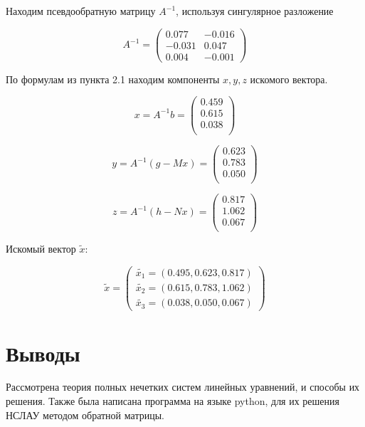 \documentclass[12pt]{article}
\begin{document}
Находим псевдообратную матрицу $A^{-1}$, используя сингулярное разложение

\[
	A^{-1} = \begin{pmatrix}
		0.077  & -0.016 \\
		-0.031 & 0.047  \\
		0.004  & -0.001
	\end{pmatrix}
\]

По формулам из пункта 2.1 находим компоненты $x, y, z$ искомого вектора.

\[
	x = A^{-1} b = \begin{pmatrix}
		0.459 \\
		0.615 \\
		0.038 \\
	\end{pmatrix}
\]

\[
	y = A^{-1}(g - Mx) = \begin{pmatrix}
		0.623 \\
		0.783 \\
		0.050 \\
	\end{pmatrix}
\]

\[
	z = A^{-1}(h - Nx) = \begin{pmatrix}
		0.817 \\
		1.062 \\
		0.067 \\
	\end{pmatrix}
\]

Искомый вектор $\tilde{x}$:

\[
	\tilde{x} = \begin{pmatrix}
		\tilde{x_1} = (0.495, 0.623, 0.817) \\
		\tilde{x_2} = (0.615, 0.783, 1.062) \\
		\tilde{x_3} = (0.038, 0.050, 0.067)
	\end{pmatrix}
\]





\section{Выводы}
Рассмотрена теория полных нечетких систем линейных уравнений, и способы их
решения. Также была написана программа на языке python, для их решения НСЛАУ
методом обратной матрицы.
\end{document}
